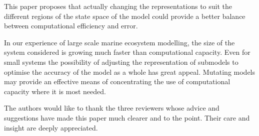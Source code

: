 This paper proposes that actually changing the representations to suit the
different regions of the state space of the model could provide a better
balance between computational efficiency and error.

In our experience of large scale marine ecosystem modelling, the size of the
system considered is growing much faster than computational capacity. Even for
small systems the possibility of adjusting the representation of submodels to
optimise the accuracy of the model as a whole has great appeal. Mutating
models may provide an effective means of concentrating the use of
computational capacity where it is most needed.



The authors would like to thank the three reviewers whose advice and
suggestions have made this paper much clearer and to the point. Their care and
insight are deeply appreciated.




